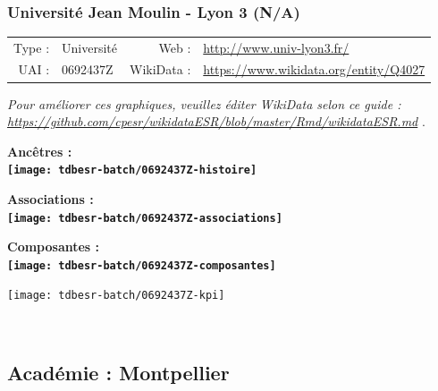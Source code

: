 \documentclass[12pt,french,]{article}
\begin{document}
\ifoddpage \fi ~\newpage  

\hypertarget{universituxe9-jean-moulin---lyon-3-na}{%
\subsubsection{Université Jean Moulin - Lyon 3
(N/A)}\label{universituxe9-jean-moulin---lyon-3-na}}

\begin{tabular*}{\textwidth}{rp{5cm}rl}  
\hline  
Type : & Université & Web : &\href{http://www.univ-lyon3.fr/}{http://www.univ-lyon3.fr/} \\  
UAI : & 0692437Z & WikiData : & \href{https://www.wikidata.org/entity/Q4027}{https://www.wikidata.org/entity/Q4027} \\  
\hline  
\end{tabular*}

\textit{\scriptsize Pour améliorer ces graphiques, veuillez éditer WikiData selon ce guide :  \href{https://github.com/cpesr/wikidataESR/blob/master/Rmd/wikidataESR.md}{https://github.com/cpesr/wikidataESR/blob/master/Rmd/wikidataESR.md}}
.

\vspace{1cm}  
\begin{minipage}[b]{0.50\textwidth}\begin{center} \bf Ancêtres : \\  
\texttt{[image: tdbesr-batch/0692437Z-histoire]} \end{center}\end{minipage}\begin{minipage}[b]{0.50\textwidth}\begin{center} \bf Associations : \\  
\texttt{[image: tdbesr-batch/0692437Z-associations]} \end{center}\end{minipage}

\hrulefill

\begin{center} \bf Composantes : \\  
\texttt{[image: tdbesr-batch/0692437Z-composantes]} \end{center}

\begin{center}\texttt{[image: tdbesr-batch/0692437Z-kpi]} \end{center}\checkoddpage

\ifoddpage \fi ~\newpage  

\hypertarget{acaduxe9mie-montpellier}{%
\subsection{Académie : Montpellier}\label{acaduxe9mie-montpellier}}
\end{document}
